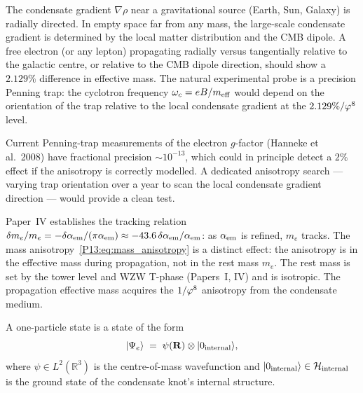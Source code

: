 \begin{remark}
\label{P13:rem:experimental_access}
The condensate gradient $\nabla\rho$ near a gravitational source
(Earth, Sun, Galaxy) is radially directed.
In empty space far from any mass, the large-scale condensate
gradient is determined by the local matter distribution and the
CMB dipole.
A free electron (or any lepton) propagating radially versus
tangentially relative to the galactic centre, or relative to
the CMB dipole direction, should show a $2.129\%$ difference
in effective mass.
The natural experimental probe is a precision Penning trap:
the cyclotron frequency $\omega_c = eB/m_{\rm eff}$ would depend
on the orientation of the trap relative to the local condensate
gradient at the $2.129\%/\varphi^8$ level.

Current Penning-trap measurements of the electron $g$-factor
(Hanneke et al.\ 2008) have fractional precision
$\sim10^{-13}$, which could in principle detect a $2\%$ effect
if the anisotropy is correctly modelled.
A dedicated anisotropy search --- varying trap orientation
over a year to scan the local condensate gradient direction ---
would provide a clean test.
\end{remark}

\begin{remark}
\label{P13:rem:tracking_relation}
Paper~IV establishes the tracking relation
$\delta m_e/m_e = -\delta\alpha_{\mathrm{em}}/(\pi\alpha_{\mathrm{em}}) \approx -43.6\,\delta\alpha_{\mathrm{em}}/\alpha_{\mathrm{em}}$:
as $\alpha_{\mathrm{em}}$ is refined, $m_e$ tracks.
The mass anisotropy~\eqref{P13:eq:mass_anisotropy} is a distinct
effect: the anisotropy is in the effective mass during propagation,
not in the rest mass $m_e$.
The rest mass is set by the tower level and WZW T-phase (Papers~I, IV)
and is isotropic.
The propagation effective mass acquires the $1/\varphi^8$ anisotropy
from the condensate medium.
\end{remark}

\begin{definition}
\label{P13:def:one_particle}
A one-particle state is a state of the form
\begin{equation}
  |\Psi_e\rangle \;=\; \psi(\mathbf{R})\otimes|0_{\rm internal}\rangle,
  \label{P13:eq:one_particle_state}
\end{equation}
where $\psi\in L^2(\mathbb{R}^3)$ is the centre-of-mass wavefunction
and $|0_{\rm internal}\rangle\in\mathcal{H}_{\rm internal}$
is the ground state of the condensate knot's internal structure.
\end{definition}

